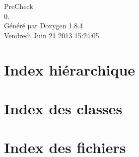 \documentclass[twoside]{book}
\newcommand{\clearemptydoublepage}{%
  \newpage{\pagestyle{empty}\cleardoublepage}%
}
\begin{document}
\hypersetup{pageanchor=false}
\begin{titlepage}
\vspace*{7cm}
\begin{center}%
{\Large Pre\-Check \\[1ex]\large 0. }\\
\vspace*{1cm}
{\large Généré par Doxygen 1.8.4}\\
\vspace*{0.5cm}
{\small Vendredi Juin 21 2013 15:24:05}\\
\end{center}
\end{titlepage}
\clearemptydoublepage
\tableofcontents
\clearemptydoublepage
{}
\hypersetup{pageanchor=true}

\chapter{Index hiérarchique}

\chapter{Index des classes}

\chapter{Index des fichiers}

\end{document}
